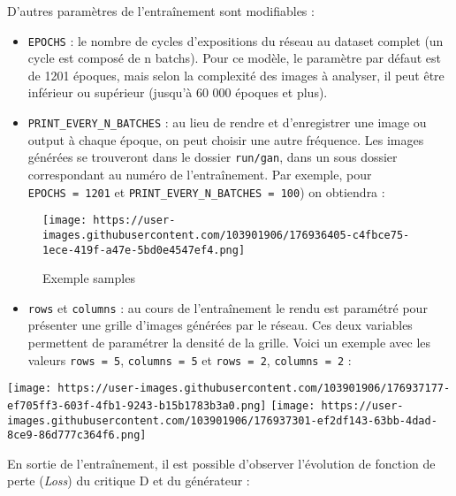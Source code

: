 \documentclass[
]{article}
\providecommand{\tightlist}{%
  \setlength{\itemsep}{0pt}\setlength{\parskip}{0pt}}
\begin{document}
D'autres paramètres de l'entraînement sont modifiables :

\begin{itemize}
\tightlist
\item
  \texttt{EPOCHS} : le nombre de cycles d'expositions du réseau au dataset complet (un cycle est composé de n batchs). Pour ce modèle, le paramètre par défaut est de 1201 époques, mais selon la complexité des images à analyser, il peut être inférieur ou supérieur (jusqu'à 60 000 époques et plus).
\item
  \texttt{PRINT\_EVERY\_N\_BATCHES} : au lieu de rendre et d'enregistrer une image ou output à chaque époque, on peut choisir une autre fréquence. Les images générées se trouveront dans le dossier \texttt{run/gan}, dans un sous dossier correspondant au numéro de l'entraînement. Par exemple, pour \texttt{EPOCHS\ =\ 1201} et \texttt{PRINT\_EVERY\_N\_BATCHES\ =\ 100}) on obtiendra :
\end{itemize}

\begin{figure}
\centering
\texttt{[image: https://user-images.githubusercontent.com/103901906/176936405-c4fbce75-1ece-419f-a47e-5bd0e4547ef4.png]}
\caption{Exemple samples}
\end{figure}

\begin{itemize}
\tightlist
\item
  \texttt{rows} et \texttt{columns} : au cours de l'entraînement le rendu est paramétré pour présenter une grille d'images générées par le réseau. Ces deux variables permettent de paramétrer la densité de la grille. Voici un exemple avec les valeurs \texttt{rows\ =\ 5}, \texttt{columns\ =\ 5} et \texttt{rows\ =\ 2}, \texttt{columns\ =\ 2} :
\end{itemize}

\texttt{[image: https://user-images.githubusercontent.com/103901906/176937177-ef705ff3-603f-4fb1-9243-b15b1783b3a0.png]} \texttt{[image: https://user-images.githubusercontent.com/103901906/176937301-ef2df143-63bb-4dad-8ce9-86d777c364f6.png]}

En sortie de l'entraînement, il est possible d'observer l'évolution de fonction de perte (\emph{Loss}) du critique D et du générateur :
\end{document}
